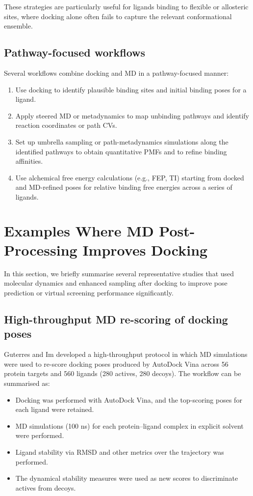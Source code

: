 \documentclass[12pt]{article}
\begin{document}
These strategies are particularly useful for ligands binding to flexible or allosteric sites, where docking alone often fails to capture the relevant conformational ensemble.

\subsection{Pathway-focused workflows}

Several workflows combine docking and MD in a pathway-focused manner:

\begin{enumerate}
\item Use docking to identify plausible binding sites and initial binding poses for a ligand.
\item Apply steered MD or metadynamics to map unbinding pathways and identify reaction coordinates or path CVs.
\item Set up umbrella sampling or path-metadynamics simulations along the identified pathways to obtain quantitative PMFs and to refine binding affinities.
\item Use alchemical free energy calculations (e.g., FEP, TI) starting from docked and MD-refined poses for relative binding free energies across a series of ligands.
\end{enumerate}

\section{Examples Where MD Post-Processing Improves Docking}

In this section, we briefly summarise several representative studies that used molecular dynamics and enhanced sampling after docking to improve pose prediction or virtual screening performance significantly.

\subsection{High-throughput MD re-scoring of docking poses}

Guterres and Im\cite{CH9_guterres2020} developed a high-throughput protocol in which MD simulations were used to re-score docking poses produced by AutoDock Vina across 56 protein targets and 560 ligands (280 actives, 280 decoys). The workflow can be summarised as:

\begin{itemize}
\item Docking was performed with AutoDock Vina, and the top-scoring poses for each ligand were retained.
\item MD simulations (100 ns) for each protein--ligand complex in explicit solvent were performed.
\item Ligand stability via RMSD and other metrics over the trajectory was performed.
\item The dynamical stability measures were used as new scores to discriminate actives from decoys.
\end{itemize}
\end{document}
